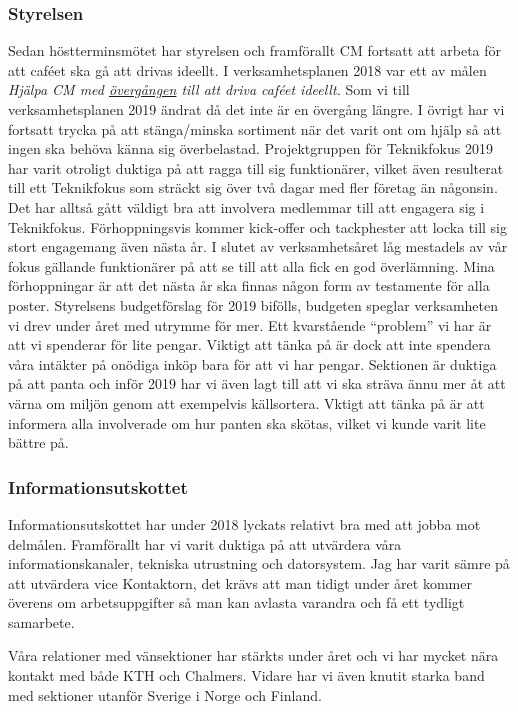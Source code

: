\documentclass[../_main/handlingar.tex]{subfiles}
\begin{document}

\subsubsection*{Styrelsen}
Sedan höstterminsmötet har styrelsen och framförallt CM fortsatt att arbeta för att caféet ska gå att drivas ideellt. I verksamhetsplanen 2018 var ett av målen \textit{Hjälpa CM med \underline{övergången} till att driva caféet ideellt.} Som vi till verksamhetsplanen 2019 ändrat då det inte är en övergång längre. I övrigt har vi fortsatt trycka på att stänga/minska sortiment när det varit ont om hjälp så att ingen ska behöva känna sig överbelastad.
Projektgruppen för Teknikfokus 2019 har varit otroligt duktiga på att ragga till sig funktionärer, vilket även resulterat till ett Teknikfokus som sträckt sig över två dagar med fler företag än någonsin. Det har alltså gått väldigt bra att involvera medlemmar till att engagera sig i Teknikfokus. Förhoppningsvis kommer kick-offer och tackphester att locka till sig stort engagemang även nästa år.
I slutet av verksamhetsåret låg mestadels av vår fokus gällande funktionärer på att se till att alla fick en god överlämning. Mina förhoppningar är att det nästa år ska finnas någon form av testamente för alla poster.
Styrelsens budgetförslag för 2019 bifölls, budgeten speglar verksamheten vi drev under året med utrymme för mer. Ett kvarstående ``problem'' vi har är att vi spenderar för lite pengar. Viktigt att tänka på är dock att inte spendera våra intäkter på onödiga inköp bara för att vi har pengar.
Sektionen är duktiga på att panta och inför 2019 har vi även lagt till att vi ska sträva ännu mer åt att värna om miljön genom att exempelvis källsortera. Vktigt att tänka på är att informera alla involverade om hur panten ska skötas, vilket vi kunde varit lite bättre på.  

\subsubsection*{Informationsutskottet}
Informationsutskottet har under 2018 lyckats relativt bra med att jobba mot delmålen. Framförallt har vi varit duktiga på att utvärdera våra informationskanaler, tekniska utrustning och datorsystem. Jag har varit sämre på att utvärdera vice Kontaktorn, det krävs att man tidigt under året kommer överens om arbetsuppgifter så man kan avlasta varandra och få ett tydligt samarbete. 

Våra relationer med vänsektioner har stärkts under året och vi har mycket nära kontakt med både KTH och Chalmers. Vidare har vi även knutit starka band med sektioner utanför Sverige i Norge och Finland.
\end{document}
